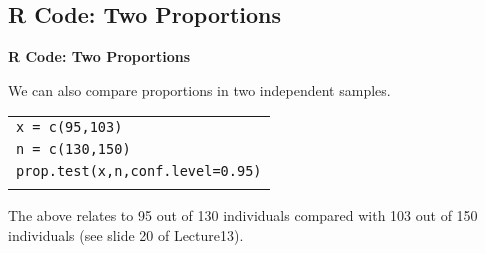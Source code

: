 \documentclass[compress]{beamer}        %
\makeatletter
\newcommand{\tcb}{\textcolor{beamer@blendedblue}}
\makeatother
\begin{document}
\subsection{R Code: Two Proportions}
\begin{frame}{\bf \tcb{R Code: Two Proportions}}

We can also compare proportions in two independent samples.\\[0.2cm]

\begin{tabular}{|l|}
\hline
\texttt{x = c(95,103)}\\
\texttt{n = c(130,150)}\\[0.2cm]
\texttt{prop.test(x,n,conf.level=0.95)}\\
\hline
\multicolumn{1}{c}{}\\[0.2cm]
\end{tabular}

The above relates to 95 out of 130 individuals compared with 103 out of 150 individuals (see slide 20 of Lecture13).\\[0.8cm]


\end{frame}
\end{document}
